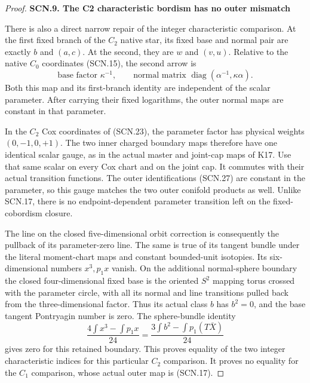 \begin{proof}
\par

\medskip\noindent\textbf{SCN.9. The C2 characteristic bordism has no outer mismatch}

\par\nobreak

There is also a direct narrow repair of the integer
characteristic comparison. At the first fixed branch
of the \(C_2\) native star, its fixed base and normal
pair are exactly \(b\) and \((a,c)\). At the second,
they are \(w\) and \((v,u)\). Relative to the native
\(C_0\) coordinates (SCN.15), the second arrow is
\[
 \text{base factor }\kappa^{-1},\qquad
 \text{normal matrix }\operatorname{diag}
                           (\alpha^{-1},\kappa\alpha).
                                                        \tag{SCN.27}
\]
Both this map and its first-branch identity are
independent of the scalar parameter. After carrying
their fixed logarithms, the outer normal maps are
constant in that parameter.

In the \(C_2\) Cox coordinates of (SCN.23), the
parameter factor has physical weights
\((0,-1,0,+1)\). The two inner charged boundary maps
therefore have one identical scalar gauge, as in
the actual master and joint-cap maps of K17.
Use that same scalar on every Cox chart and on the
joint cap. It commutes with their actual transition
functions. The outer identifications (SCN.27) are
constant in the parameter, so this gauge matches
the two outer conifold products as well. Unlike
SCN.17, there is no endpoint-dependent parameter
transition left on the fixed-cobordism closure.

The line on the closed five-dimensional orbit
correction is consequently the pullback of its
parameter-zero line. The same is true of its
tangent bundle under the literal moment-chart
maps and constant bounded-unit isotopies. Its
six-dimensional numbers \(x^3,p_1x\) vanish.
On the additional normal-sphere boundary the
closed four-dimensional fixed base is the
oriented \(S^2\) mapping torus crossed with the
parameter circle, with all its normal and line
transitions pulled back from the three-dimensional
factor. Thus its actual class \(b\) has \(b^2=0\),
and the base tangent Pontryagin number is zero.
The sphere-bundle identity
\[
       \frac{4\int x^3-\int p_1x}{24}
                 =\frac{3\int b^2-\int p_1(T\bar X)}{24}
\]
gives zero for this retained boundary. This proves
equality of the two integer characteristic indices
for this particular \(C_2\) comparison. It proves
no equality for the \(C_1\) comparison, whose
actual outer map is (SCN.17).


\end{proof}
